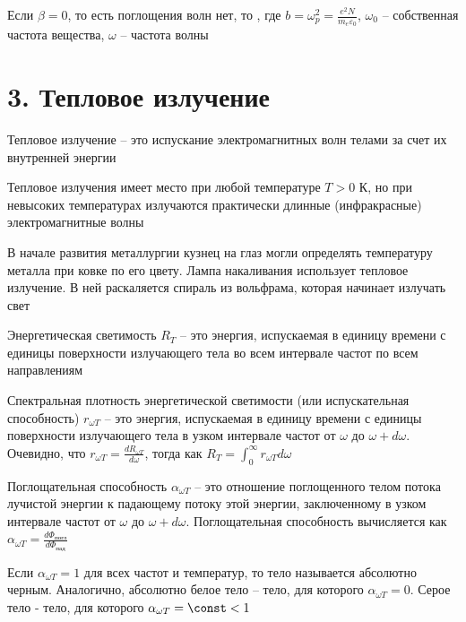 \documentclass[12pt]{article}
\begin{document}
Если $\beta = 0$, то есть поглощения волн нет, то , где $b = \omega_p^2 = \frac{e^2 N}{m_e \varepsilon_0}$, $\omega_0$ -- собственная частота вещества, $\omega$ -- частота волны


\section{3. Тепловое излучение}

Тепловое излучение -- это испускание электромагнитных волн телами за счет их внутренней энергии

Тепловое излучения имеет место при любой температуре $T > 0$ К, но при невысоких температурах излучаются практически длинные (инфракрасные) электромагнитные волны

В начале развития металлургии кузнец на глаз могли определять температуру металла при ковке по его цвету. Лампа накаливания использует тепловое излучение. В ней раскаляется спираль из вольфрама, которая начинает излучать свет

Энергетическая светимость $R_{T}$ -- это энергия, испускаемая в единицу времени с единицы поверхности излучающего тела во всем интервале частот по всем направлениям

Спектральная плотность энергетической светимости (или испускательная способность) $r_{\omega T}$ -- это энергия, испускаемая в единицу времени с единицы поверхности излучающего тела в узком интервале частот от $\omega$ до $\omega + d \omega$. Очевидно, что $r_{\omega T} = \frac{d R_{\omega T}}{d \omega}$, тогда как $R_T = \int_0^\infty r_{\omega T} d\omega$

Поглощательная способность $\alpha_{\omega T}$ -- это отношение поглощенного телом потока лучистой энергии к падающему потоку этой энергии, заключенному в узком интервале частот от $\omega$ до $\omega + d\omega$. Поглощательная способность вычисляется как $\alpha_{\omega T} = \frac{d \Phi_{\text{погл}}}{d \Phi_{\text{пад}}}$

Если $\alpha_{\omega T} = 1$ для всех частот и температур, то тело называется абсолютно черным. Аналогично, абсолютно белое тело -- тело, для которого $\alpha_{\omega T} = 0$. Серое тело - тело, для которого $\alpha_{\omega T} = \const < 1$

\mediumvspace

\end{document}
